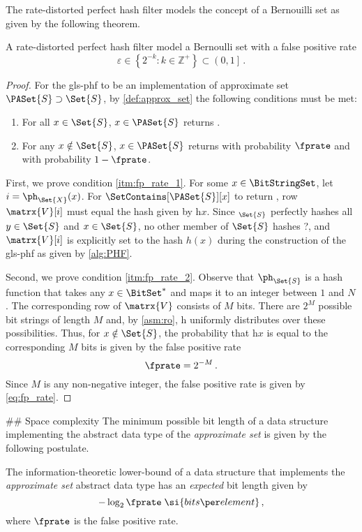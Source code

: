 The rate-distorted perfect hash filter models the concept of a Bernouilli set
as given by the following theorem.
\begin{theorem}
\label{thm:fp_rate}
A rate-distorted perfect hash filter model a Bernoulli set with a false positive rate
\begin{equation}
\label{eq:fp_rate}
    \varepsilon \in \left\{ 2^{-k} \colon k \in \mathbb{Z}^+\right\} \subset \left(0, 1\right]\,.
\end{equation}
\end{theorem}
\begin{proof}
For the \gls{gls-phf} to be an implementation of approximate set $\PASet{S} \supset \Set{S}$, by \cref{def:approx_set} the following conditions must be met:
\begin{enumerate}
\item\label{itm:fp_rate_1} For all $x \in \Set{S}$, $x \in \PASet{S}$ returns \True.
\item\label{itm:fp_rate_2} For any $x \notin \Set{S}$, $x \in \PASet{S}$ returns \True with probability $\fprate$ and \False with probability $1 - \fprate$.
\end{enumerate}

First, we prove condition \ref{itm:fp_rate_1}. For some $x \in \BitStringSet$,
let $i = \ph_{\Set{X}}(x)$. For $\SetContains[\PASet{S}][x]$ to return \True, row $\matrx{V}[i]$ must equal the hash given by h{$x$}. Since \ph$_{\Set{S}}$ perfectly hashes all $y \in \Set{S}$ and $x \in \Set{S}$, no other member of $\Set{S}$ hashes ?, and $\matrx{V}[i]$ is explicitly set to the hash $h(x)$ during the construction of the \gls{gls-phf} as given by \cref{alg:PHF}.

Second, we prove condition \ref{itm:fp_rate_2}. Observe that $\ph_{\Set{S}}$ is a hash function that takes any $x \in \BitSet^*$ and maps it to an integer between $1$ and $N$. The corresponding row of $\matrx{V}$ consists of $M$ bits. There are $2^M$ possible bit strings of length $M$ and, by \cref{asm:ro}, h uniformly distributes over these possibilities. Thus, for $x \notin \Set{S}$, the probability that h{$x$} is equal to the corresponding $M$ bits is given by the false positive rate
\begin{equation}
\fprate = 2^{-M}\,.
\end{equation}
Since $M$ is any non-negative integer, the false positive rate is given by \cref{eq:fp_rate}.
\end{proof}

## Space complexity
The minimum possible bit length of a data structure implementing the abstract data type of the \emph{approximate set} is given by the following postulate.
\begin{postulate}
\label{pst:approx_l_b}
The information-theoretic lower-bound of a data structure that implements the \emph{approximate set} abstract data type has an \emph{expected} bit length given by
\begin{equation}
    -\log_2 \fprate \; \si{bits \per element}\,,
\end{equation}
where $\fprate$ is the false positive rate.
\end{postulate}

